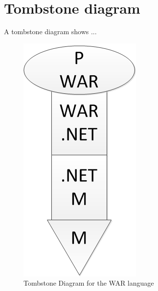 \section{Tombstone diagram}

A tombstone diagram shows ...

			\begin{figure}
				\centering
				\includegraphics{rapport/3/figures/tombstone}
				\caption{Tombstone Diagram for the WAR language} \label{fig:tombstone}
			\end{figure}
			
